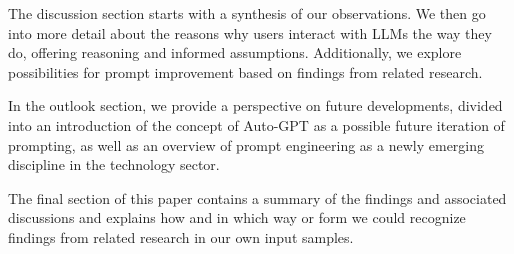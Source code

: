 The discussion section starts with a synthesis of our observations.
We then go into more detail about the reasons why users interact with LLMs the way they do,
offering reasoning and informed assumptions.
Additionally, we explore possibilities for prompt improvement based on findings from related
research.

In the outlook section, we provide a perspective on future developments, divided into an
introduction of the concept of Auto-GPT as a possible future iteration of prompting, as well as an
overview of prompt engineering as a newly emerging discipline in the technology sector.

The final section of this paper contains a summary of the findings and associated discussions and
explains how and in which way or form we could recognize findings from related research in our
own input samples.